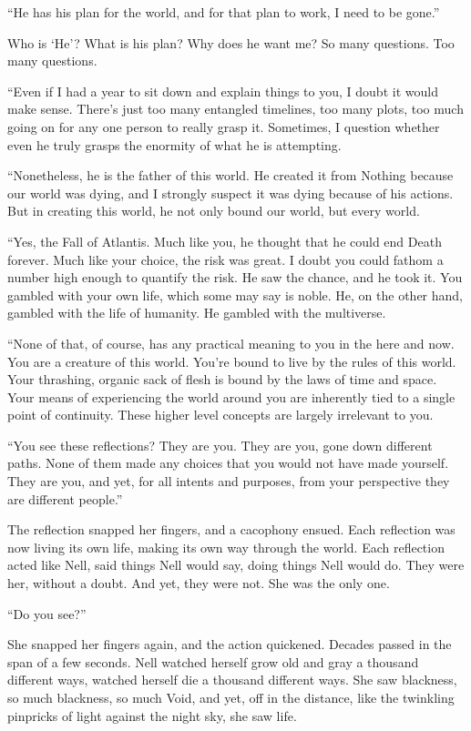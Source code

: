“He has his plan for the world, and for that plan to work, I need to be gone.”

Who is ‘He’? What is his plan? Why does he want me? So many questions. Too many questions. 

“Even if I had a year to sit down and explain things to you,  I doubt it would make sense. There’s just too many entangled timelines, too many plots, too much going on for any one person to really grasp it. Sometimes, I question whether even he truly grasps the enormity of what he is attempting.

“Nonetheless, he is the father of this world. He created it from Nothing because our world was dying, and I strongly suspect it was dying because of his actions. But in creating this world, he not only bound our world, but every world. 

“Yes, the Fall of Atlantis. Much like you, he thought that he could end Death forever. Much like your choice, the risk was great. I doubt you could fathom a number high enough to quantify the risk. He saw the chance, and he took it. You gambled with your own life, which some may say is noble. He, on the other hand, gambled with the life of humanity. He gambled with the multiverse. 

“None of that, of course, has any practical meaning to you in the here and now. You are a creature of this world. You’re bound to live by the rules of this world. Your thrashing, organic sack of flesh is bound by the laws of time and space. Your means of experiencing the world around you are inherently tied to a single point of continuity. These higher level concepts are largely irrelevant to you.

“You see these reflections? They are you. They are you, gone down different paths. None of them made any choices that you would not have made yourself. They are you, and yet, for all intents and purposes, from your perspective they are different people.”

The reflection snapped her fingers, and a cacophony ensued. Each reflection was now living its own life, making its own way through the world. Each reflection acted like Nell, said things Nell would say, doing things Nell would do. They were her, without a doubt. And yet, they were not. She was the only one.

“Do you see?”

She snapped her fingers again, and the action quickened. Decades passed in the span of a few seconds. Nell watched herself grow old and gray a thousand different ways, watched herself die a thousand different ways. She saw blackness, so much blackness, so much Void, and yet, off in the distance, like the twinkling pinpricks of light against the night sky, she saw life.

